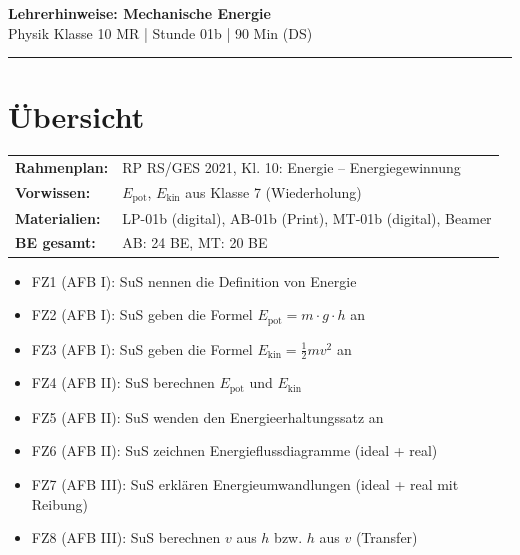 \documentclass[11pt, a4paper]{article}
\newcommand{\fach}{Physik}
\newcommand{\thema}{Mechanische Energie}
\newcommand{\klasse}{10 MR}
\newcommand{\stession}{01b}
\newcommand{\dauer}{90 Min (DS)}
\begin{document}

\begin{center}
    {\Large\bfseries\textcolor{fachfarbe}{Lehrerhinweise: \thema}}\\[0.3em]
    {\small \fach{} Klasse \klasse{} | Stunde \stession{} | \dauer}
\end{center}
\vspace{-0.3em}
\hrule
\vspace{0.8em}


\section*{Übersicht}

\begin{tabularx}{\textwidth}{@{}lX@{}}
\textbf{Rahmenplan:} & RP RS/GES 2021, Kl. 10: Energie – Energiegewinnung \\
\textbf{Vorwissen:} & $E_\text{pot}$, $E_\text{kin}$ aus Klasse 7 (Wiederholung) \\
\textbf{Materialien:} & LP-01b (digital), AB-01b (Print), MT-01b (digital), Beamer \\
\textbf{BE gesamt:} & AB: 24 BE, MT: 20 BE \\
\end{tabularx}

\begin{infobox}
\begin{itemize}[leftmargin=2em, itemsep=2pt]
    \item FZ1 (AFB I): SuS nennen die Definition von Energie
    \item FZ2 (AFB I): SuS geben die Formel $E_\text{pot} = m \cdot g \cdot h$ an
    \item FZ3 (AFB I): SuS geben die Formel $E_\text{kin} = \frac{1}{2} m v^2$ an
    \item FZ4 (AFB II): SuS berechnen $E_\text{pot}$ und $E_\text{kin}$
    \item FZ5 (AFB II): SuS wenden den Energieerhaltungssatz an
    \item FZ6 (AFB II): SuS zeichnen Energieflussdiagramme (ideal + real)
    \item FZ7 (AFB III): SuS erklären Energieumwandlungen (ideal + real mit Reibung)
    \item FZ8 (AFB III): SuS berechnen $v$ aus $h$ bzw. $h$ aus $v$ (Transfer)
\end{itemize}
\end{infobox}
\end{document}
